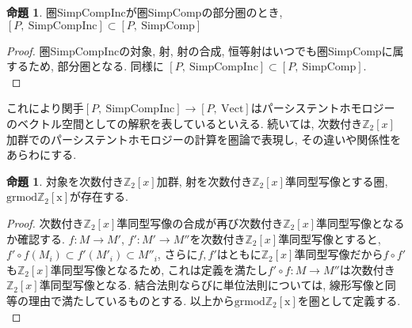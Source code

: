 \documentclass[a4paper]{jsarticle}
\theoremstyle{definition}
\newtheorem{prop}[dfn]{命題}
\newcommand{\SimpComp}{{\mathrm{SimpComp}}}
\newcommand{\Fun}[2]{[#1,~#2]}
\newcommand{\Vect}{{\mathrm{Vect}}}
\newcommand{\SimpCompInc}{{\mathrm{SimpCompInc}}}
\newcommand{\grmodZ}{{\mathrm{grmod \mathbb{Z}_2[x]}}}
\begin{document}
\begin{prop}
    圏SimpCompIncが圏SimpCompの部分圏のとき,\\ $\Fun{P}{\SimpCompInc}\subset \Fun{P}{\SimpComp}$
\end{prop}
\begin{proof}
     圏SimpCompIncの対象, 射, 射の合成, 恒等射はいつでも圏SimpCompに属するため, 部分圏となる. 同様に $\Fun{P}{\SimpCompInc}\subset \Fun{P}{\SimpComp}$.\\
\end{proof}
 これにより関手$\Fun{P}{\SimpCompInc} \rightarrow \Fun{P}{\Vect}$はパーシステントホモロジーのベクトル空間としての解釈を表しているといえる. 続いては, 次数付き$\mathbb{Z}_2[x]$加群でのパーシステントホモロジーの計算を圏論で表現し, その違いや関係性をあらわにする.
\begin{prop}
    対象を次数付き$\mathbb{Z}_2[x]$加群, 射を次数付き$\mathbb{Z}_2[x]$準同型写像とする圏, $\grmodZ$が存在する.
\end{prop}
\begin{proof}
    次数付き$\mathbb{Z}_2[x]$準同型写像の合成が再び次数付き$\mathbb{Z}_2[x]$準同型写像となるか確認する. $f:M\rightarrow M'$, $f':M'\rightarrow M''$を次数付き$\mathbb{Z}_2[x]$準同型写像とすると, $ f'\circ f(M_i)\subset f'(M'_i) \subset M''_i$, さらに$f, f'$はともに$\mathbb{Z}_2[x]$準同型写像だから$f\circ f'$も$\mathbb{Z}_2[x]$準同型写像となるため, これは定義を満たし$f'\circ f:M\rightarrow M''$は次数付き$\mathbb{Z}_2[x]$準同型写像となる. 結合法則ならびに単位法則については, 線形写像と同等の理由で満たしているものとする. 以上から$\grmodZ$を圏として定義する.\\
\end{proof}
\end{document}
